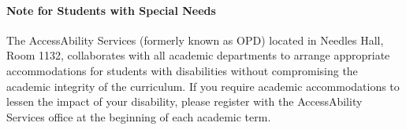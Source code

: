 \documentclass[letterpaper,10pt]{article}
\begin{document}
\paragraph{Note for Students with Special Needs}
The AccessAbility Services (formerly known as OPD) located in Needles Hall, Room 1132, collaborates with all academic departments to arrange appropriate accommodations for students with disabilities without compromising the academic integrity of the curriculum. If you require academic accommodations to lessen the impact of your disability, please register with the AccessAbility Services office at the beginning of each academic term.
\end{document}
